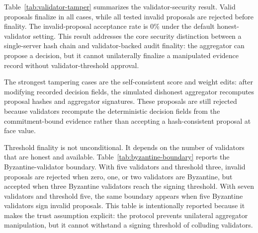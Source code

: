 \documentclass[preprint,12pt]{elsarticle}
\begin{document}
Table~\ref{tab:validator-tamper} summarizes the validator-security result. Valid proposals finalize in all cases, while all tested invalid proposals are rejected before finality. The invalid-proposal acceptance rate is 0\% under the default honest-validator setting. This result addresses the core security distinction between a single-server hash chain and validator-backed audit finality: the aggregator can propose a decision, but it cannot unilaterally finalize a manipulated evidence record without validator-threshold approval.

The strongest tampering cases are the self-consistent score and weight edits: after modifying recorded decision fields, the simulated dishonest aggregator recomputes proposal hashes and aggregator signatures. These proposals are still rejected because validators recompute the deterministic decision fields from the commitment-bound evidence rather than accepting a hash-consistent proposal at face value.

\begin{table}[t]
\centering
\caption{Validator-backed finality under aggregator and payload tampering. Values summarize 39 proposed-method runs and 3600 valid audit blocks; higher valid finalization/rejection and lower invalid acceptance are better.}
\label{tab:validator-tamper}
\end{table}

Threshold finality is not unconditional. It depends on the number of validators that are honest and available. Table~\ref{tab:byzantine-boundary} reports the Byzantine-validator boundary. With five validators and threshold three, invalid proposals are rejected when zero, one, or two validators are Byzantine, but accepted when three Byzantine validators reach the signing threshold. With seven validators and threshold five, the same boundary appears when five Byzantine validators sign invalid proposals. This table is intentionally reported because it makes the trust assumption explicit: the protocol prevents unilateral aggregator manipulation, but it cannot withstand a signing threshold of colluding validators.
\end{document}
